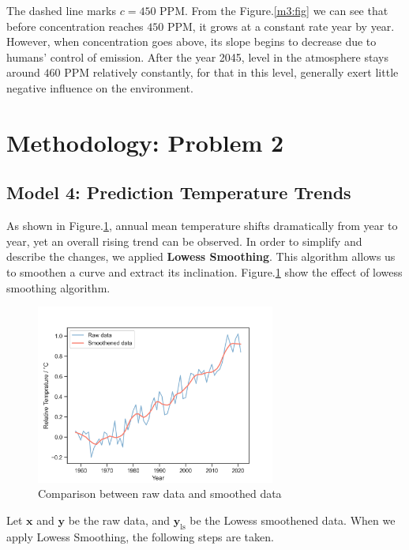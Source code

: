 \documentclass[12pt]{article}
\begin{document}
The dashed line marks $c=450$ PPM. From the Figure.\ref{m3:fig} we can see that before  concentration reaches $450$ PPM, it grows at a constant rate year by year. However, when  concentration goes above, its slope begins to decrease due to humans' control of  emission. After the year 2045,  level in the atmosphere stays around $460$ PPM relatively constantly, for that in this level,  generally exert little negative influence on the environment.


\section{Methodology: Problem 2}
\label{method:2}

\subsection{Model 4: Prediction Temperature Trends}

As shown in Figure.\ref{smooth}, annual mean temperature shifts dramatically from year to year, yet an overall rising trend can be observed. In order to simplify and describe the changes, we applied \textbf{Lowess Smoothing}. This algorithm allows us to smoothen a curve and extract its inclination. Figure.\ref{smooth} show the effect of lowess smoothing algorithm. 

\begin{figure}[hbt]
    \centering
    \includegraphics[width = 0.7\textwidth]{fig/Lowess.png}
    \caption{Comparison between raw data and smoothed data}
    \label{smooth}
\end{figure}

Let $\boldsymbol{x}$ and $\boldsymbol{y}$ be the raw data, and $\boldsymbol{y}_{\text{ls}}$ be the Lowess smoothened data. When we apply Lowess Smoothing, the following steps are taken.
\end{document}
